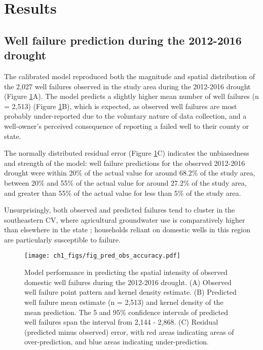 \section{Results}

\subsection{Well failure prediction during the 2012-2016 drought}

The calibrated model reproduced both the magnitude and spatial distribution of the 2,027 well failures observed in the study area during the 2012-2016 drought (Figure \ref{fig:pred_obs}A). The model predicts a slightly higher mean number of well failures (n = 2,513) (Figure \ref{fig:pred_obs}B), which is expected, as observed well failures are most probably under-reported due to the voluntary nature of data collection, and a well-owner's perceived consequence of reporting a failed well to their county or state. 

The normally distributed residual error (Figure \ref{fig:pred_obs}C) indicates the unbiasedness and strength of the model: well failure predictions for the observed 2012-2016 drought were within 20\% of the actual value for around 68.2\% of the study area, between 20\% and 55\% of the actual value for around 27.2\% of the study area, and greater than 55\% of the actual value for less than 5\% of the study area. 

Unsurprisingly, both observed and predicted failures tend to cluster in the southeastern CV, where agricultural groundwater use is comparatively higher than elsewhere in the state \citep{Brush2013, Faunted.2009}; households reliant on domestic wells in this region are particularly susceptible to failure. 


\begin{figure}%
	\centering
	\texttt{[image: ch1\_figs/fig\_pred\_obs\_accuracy.pdf]}
	\caption{Model performance in predicting the spatial intensity of observed domestic well failures during the 2012-2016 drought. (A) Observed well failure point pattern and kernel density estimate. (B) Predicted well failure mean estimate (n = 2,513) and kernel density of the mean prediction. The 5 and 95\% confidence intervals of predicted well failures span the interval from 2,144 - 2,868. (C) Residual (predicted minus observed) error, with red areas indicating areas of over-prediction, and blue areas indicating under-prediction.}
	\label{fig:pred_obs}
\end{figure}



